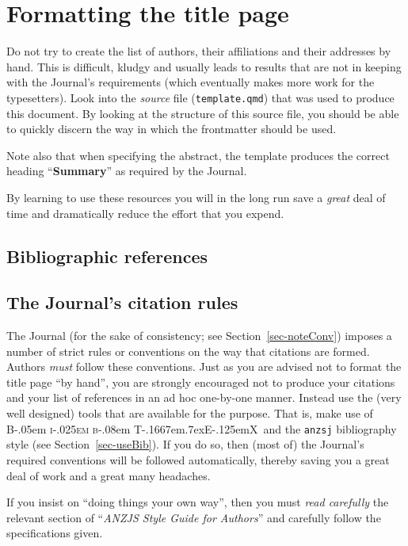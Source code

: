 \documentclass[
doublespace,
  times]{anzsauth}
\newcommand\BibTeX{{\rmfamily B\kern-.05em \textsc{i\kern-.025em b}\kern-.08em
T\kern-.1667em\lower.7ex\hbox{E}\kern-.125emX}}
\begin{document}
\section{Formatting the title page}\label{sec-titPage}

Do not try to create the list of authors, their affiliations and their
addresses by hand. This is difficult, kludgy and usually leads to
results that are not in keeping with the Journal's requirements (which
eventually makes more work for the typesetters). Look into the
\emph{source} file (\texttt{template.qmd}) that was used to produce this
document. By looking at the structure of this source file, you should be
able to quickly discern the way in which the frontmatter should be used.

Note also that when specifying the abstract, the template produces the
correct heading ``\textbf{Summary}'' as required by the Journal.

By learning to use these resources you will in the long run save a
\emph{great} deal of time and dramatically reduce the effort that you
expend.

\subsection{Bibliographic references}\label{sec-bibRef}

\subsection{The Journal's citation rules}\label{sec-citeRules}

The Journal (for the sake of consistency; see
Section~\ref{sec-noteConv}) imposes a number of strict rules or
conventions on the way that citations are formed. Authors \emph{must}
follow these conventions. Just as you are advised not to format the
title page ``by hand'', you are strongly encouraged not to produce your
citations and your list of references in an ad hoc one-by-one manner.
Instead use the (very well designed) tools that are available for the
purpose. That is, make use of \BibTeX~and the \texttt{anzsj}
bibliography style (see Section~\ref{sec-useBib}). If you do so, then
(most of) the Journal's required conventions will be followed
automatically, thereby saving you a great deal of work and a great many
headaches.

If you insist on ``doing things your own way'', then you must \emph{read
carefully} the relevant section of ``\emph{ANZJS Style Guide for
Authors}'' and carefully follow the specifications given.
\end{document}
